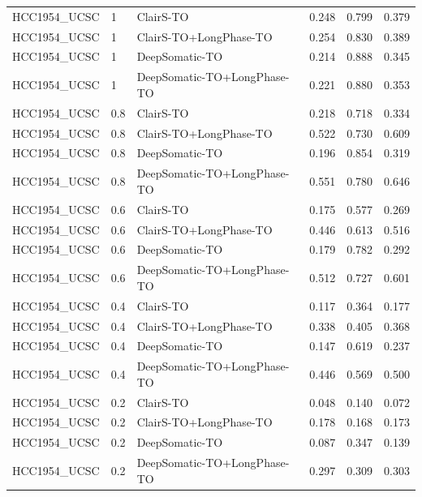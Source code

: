 \documentclass[pdflatex,sn-nature]{sn-jnl}
\begin{document}
{\begin{longtable}{@{}lllccc@{}}
  HCC1954\_UCSC & 1 & ClairS-TO & 0.248 & 0.799 & 0.379 \\
  HCC1954\_UCSC & 1 & ClairS-TO+LongPhase-TO & 0.254 & 0.830 & 0.389 \\
  HCC1954\_UCSC & 1 & DeepSomatic-TO & 0.214 & 0.888 & 0.345 \\
  HCC1954\_UCSC & 1 & DeepSomatic-TO+LongPhase-TO & 0.221 & 0.880 & 0.353 \\
  HCC1954\_UCSC & 0.8 & ClairS-TO & 0.218 & 0.718 & 0.334 \\
  HCC1954\_UCSC & 0.8 & ClairS-TO+LongPhase-TO & 0.522 & 0.730 & 0.609 \\
  HCC1954\_UCSC & 0.8 & DeepSomatic-TO & 0.196 & 0.854 & 0.319 \\
  HCC1954\_UCSC & 0.8 & DeepSomatic-TO+LongPhase-TO & 0.551 & 0.780 & 0.646 \\
  HCC1954\_UCSC & 0.6 & ClairS-TO & 0.175 & 0.577 & 0.269 \\
  HCC1954\_UCSC & 0.6 & ClairS-TO+LongPhase-TO & 0.446 & 0.613 & 0.516 \\
  HCC1954\_UCSC & 0.6 & DeepSomatic-TO & 0.179 & 0.782 & 0.292 \\
  HCC1954\_UCSC & 0.6 & DeepSomatic-TO+LongPhase-TO & 0.512 & 0.727 & 0.601 \\
  HCC1954\_UCSC & 0.4 & ClairS-TO & 0.117 & 0.364 & 0.177 \\
  HCC1954\_UCSC & 0.4 & ClairS-TO+LongPhase-TO & 0.338 & 0.405 & 0.368 \\
  HCC1954\_UCSC & 0.4 & DeepSomatic-TO & 0.147 & 0.619 & 0.237 \\
  HCC1954\_UCSC & 0.4 & DeepSomatic-TO+LongPhase-TO & 0.446 & 0.569 & 0.500 \\
  HCC1954\_UCSC & 0.2 & ClairS-TO & 0.048 & 0.140 & 0.072 \\
  HCC1954\_UCSC & 0.2 & ClairS-TO+LongPhase-TO & 0.178 & 0.168 & 0.173 \\
  HCC1954\_UCSC & 0.2 & DeepSomatic-TO & 0.087 & 0.347 & 0.139 \\
  HCC1954\_UCSC & 0.2 & DeepSomatic-TO+LongPhase-TO & 0.297 & 0.309 & 0.303 \\
\end{longtable}
}
\end{document}
